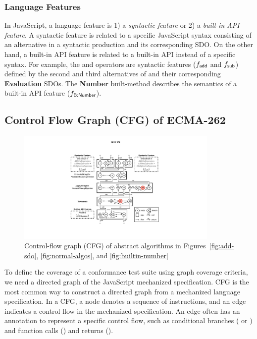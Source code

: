 
\subsubsection{Language Features}\label{sec:feat}

In JavaScript, a language feature is 1) a \textit{syntactic feature} or 2) a
\textit{built-in API feature}.
A syntactic feature is related to a specific JavaScript syntax consisting of an
alternative in a syntactic production and its corresponding SDO.
On the other hand, a built-in API feature is related to a built-in API instead
of a specific syntax.
For example, the \scode{+} and \scode{-} operators are
syntactic features ($f_{\textsf{add}}$ and $f_{\textsf{sub}}$) defined by the second and third
alternatives of  and their corresponding \textbf{Evaluation} SDOs.
The \textbf{Number} built-method describes the semantics of a built-in
 API feature ($f_{\textsf{B:Number}}$).

\subsection{Control Flow Graph (CFG) of ECMA-262}\label{sec:cfg}

\begin{figure}[t]
  \centering
  \includegraphics[width=0.87\textwidth]{img/spec-cfg}
  \caption{
    Control-flow graph (CFG) of abstract algorithms in
    Figures~\ref{fig:add-sdo}, \ref{fig:normal-algos}, and
    \ref{fig:builtin-number}
  }
  \label{fig:spec-cfg}
\vspace*{-1em}
\end{figure}

To define the coverage of a conformance test suite using graph coverage criteria,
we need a directed graph of the JavaScript mechanized specification.
CFG is the most common way to construct a directed
graph from a mechanized language specification.
In a CFG, a node denotes a sequence of instructions, and an edge
indicates a control flow in the mechanized specification.
An edge often has an annotation to represent a specific control flow,
such as conditional branches ( or ) and function calls
() and returns ().

